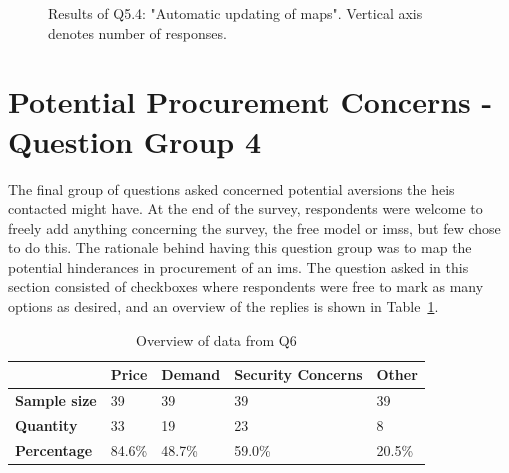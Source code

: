 \begin{figure}[H]
    \centering
    \caption{Results of Q5.4: "Automatic updating of maps". Vertical axis denotes number of responses.}
    \label{fig:q54}
\end{figure}

\newpage

\section{Potential Procurement Concerns - Question Group 4}
The final group of questions asked concerned potential aversions the \glspl{hei} contacted might have. At the end of the survey, respondents were welcome to freely add anything concerning the survey, the free model or \glspl{ims}, but few chose to do this. The rationale behind having this question group was to map the potential hinderances in procurement of an \gls{ims}. The question asked in this section consisted of checkboxes where respondents were free to mark as many options as desired, and an overview of the replies is shown in Table~\ref{q6}.


\begin{table}[H]
\centering
\caption{Overview of data from Q6}
\label{q6}
\begin{tabular}{l|l|l|l|l|}
\cline{2-5}
                                           & \textbf{Price} & \textbf{Demand} & \textbf{Security Concerns} & \textbf{Other} \\ \hline
\multicolumn{1}{|l|}{\textbf{Sample size}} & 39             & 39              & 39                         & 39             \\ \hline
\multicolumn{1}{|l|}{\textbf{Quantity}}    & 33             & 19              & 23                         & 8              \\ \hline
\multicolumn{1}{|l|}{\textbf{Percentage}}  & 84.6\%         & 48.7\%          & 59.0\%                     & 20.5\%         \\ \hline
\end{tabular}
\end{table}

